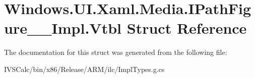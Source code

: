 \hypertarget{struct_windows_1_1_u_i_1_1_xaml_1_1_media_1_1_i_path_figure_____impl_1_1_vtbl}{}\section{Windows.\+U\+I.\+Xaml.\+Media.\+I\+Path\+Figure\+\_\+\+\_\+\+Impl.\+Vtbl Struct Reference}
\label{struct_windows_1_1_u_i_1_1_xaml_1_1_media_1_1_i_path_figure_____impl_1_1_vtbl}


The documentation for this struct was generated from the following file\+:\begin{DoxyCompactItemize}
\item 
I\+V\+S\+Calc/bin/x86/\+Release/\+A\+R\+M/ilc/Impl\+Types.\+g.\+cs\end{DoxyCompactItemize}
